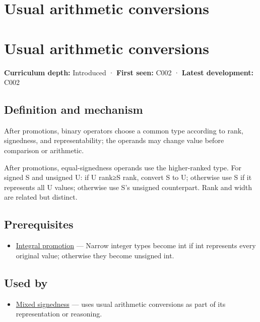 \hypertarget{appendix-5e2d663adf7f}{}
\section*{Usual arithmetic conversions}
\section{Usual arithmetic conversions}\label{appendix-5e2d663adf7f-usual-arithmetic-conversions}

\textbf{Curriculum depth:} Introduced · \textbf{First seen:} C002 · \textbf{Latest development:} C002

\subsection{Definition and mechanism}\label{appendix-5e2d663adf7f-definition-and-mechanism}

After promotions, binary operators choose a common type according to rank, signedness, and representability; the operands may change value before comparison or arithmetic.

After promotions, equal-signedness operands use the higher-ranked type. For signed S and unsigned U: if U rank≥S rank, convert S to U; otherwise use S if it represents all U values; otherwise use S's unsigned counterpart. Rank and width are related but distinct.

\subsection{Prerequisites}\label{appendix-5e2d663adf7f-prerequisites}

\begin{itemize}
\tightlist
\item
  \hyperref[appendix-45303d03796a]{Integral promotion} --- Narrow integer types become int if int represents every original value; otherwise they become unsigned int.
\end{itemize}

\subsection{Used by}\label{appendix-5e2d663adf7f-used-by}

\begin{itemize}
\tightlist
\item
  \hyperref[appendix-736a2345de4a]{Mixed signedness} --- uses usual arithmetic conversions as part of its representation or reasoning.
\end{itemize}

